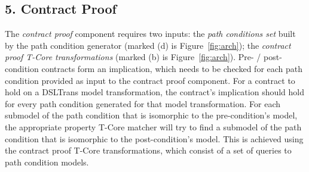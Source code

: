 
 
\subsection*{5. Contract Proof}

The \emph{contract proof} component requires two inputs: the \emph{path
conditions set} built by the path condition generator (marked (d) is Figure~\ref{fig:arch}); the \emph{contract
proof T-Core transformations} (marked (b) is Figure~\ref{fig:arch}).
Pre- / post- condition contracts form an implication, which needs to be checked
for each path condition provided as input to the contract proof component. For a
contract to hold on a DSLTrans model transformation, the contract's implication
should hold for every path condition generated for that model transformation.
For each submodel of the path condition that is isomorphic to the
pre-condition's model, the appropriate property T-Core matcher will try to find
a submodel of the path condition that is isomorphic to the post-condition's
model. This is achieved using the contract proof T-Core transformations, which
consist of a set of queries to path condition models.



